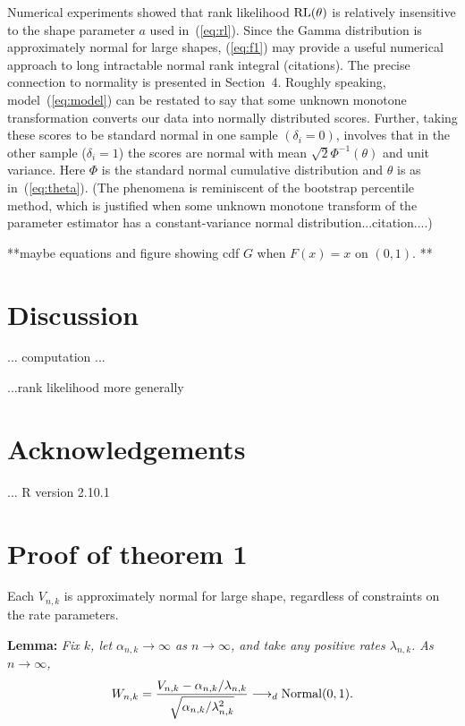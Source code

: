 Numerical experiments showed that rank likelihood ${\rm RL}(\theta)$
is relatively insensitive to the shape parameter $a$ used in~(\ref{eq:rl}).
Since the Gamma distribution is approximately normal for large shapes,
(\ref{eq:f1}) may provide a useful numerical approach
to long intractable normal rank integral (citations).  The precise
connection to normality is presented in Section~4.  Roughly speaking,
model~(\ref{eq:model}) can be restated to say that some unknown
monotone transformation converts our data into  normally distributed scores.
Further, taking these scores to be standard normal in one sample $(\delta_i=0)$,
involves that in the other sample ($\delta_i=1$) 
 the scores are normal with mean $\sqrt{2} \Phi^{-1}(\theta)$   and unit
variance.  Here $\Phi$ is the standard normal cumulative distribution and
$\theta$ is as in~(\ref{eq:theta}).  (The phenomena is reminiscent of 
the bootstrap percentile method, which is justified when some unknown
monotone transform of the parameter estimator has a constant-variance
 normal distribution...citation....)

 **maybe equations and figure showing cdf $G$ when $F(x) = x$ on $(0,1)$. **




\section{Discussion}

 ... computation ...

...rank likelihood more generally


\section*{Acknowledgements}... R version 2.10.1


\section*{Proof of theorem 1}

Each $V_{n,k}$ is approximately normal for large shape,
regardless of constraints on the rate parameters.

\noindent
{\bf Lemma:} 
 \textit{ Fix $k$, let $\alpha_{n,k} \rightarrow \infty$ 
 as $n \rightarrow \infty$, and take any positive rates $\lambda_{n,k}$. As $n \rightarrow \infty$,}
\begin{eqnarray*}
 W_{n,k} = \frac{ V_{n,k} - \alpha_{n,k}/\lambda_{n,k} }{
        \sqrt{ \alpha_{n,k}/\lambda_{n,k}^2 } }
   \longrightarrow_{d} {\mbox {\rm Normal}}(0,1) .
\end{eqnarray*}


